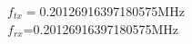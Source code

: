 \documentclass[preview]{standalone}
\begin{document}
\begin{center}
$f_{tx}=$0.20126916397180575MHz\\$f_{rx}$=0.20126916397180575MHz
\end{center}
\end{document}
